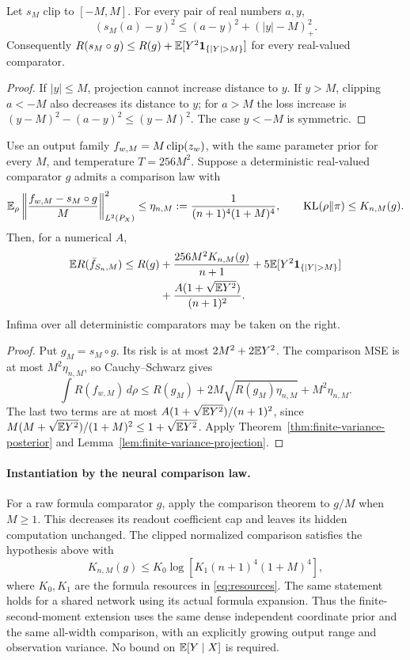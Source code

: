 \begin{lemma}
\label{lem:finite-variance-projection}
Let $s_M$ clip to $[-M,M]$. For every pair of real numbers $a,y$,
\begin{equation}
 (s_M(a)-y)^2\le(a-y)^2+(|y|-M)_+^2.
 \label{eq:pointwise-projection-transfer}
\end{equation}
Consequently $R(s_M\circ g)\le R(g)+
\E[Y^2\mathbf1_{\{|Y|>M\}}]$ for every real-valued comparator.
\end{lemma}
\begin{proof}
If $|y|\le M$, projection cannot increase distance to $y$.
If $y>M$, clipping $a<-M$ also decreases its distance to $y$;
for $a>M$ the loss increase is
$(y-M)^2-(a-y)^2\le(y-M)^2$.
The case $y<-M$ is symmetric.
\end{proof}

\begin{corollary}
\label{cor:finite-variance-comparator}
Use an output family $f_{w,M}=M\operatorname{clip}(z_w)$, with the same parameter
prior for every $M$, and temperature $T=256M^2$.
Suppose a deterministic real-valued comparator $g$ admits a
comparison law with
\[
 \mathbb E_\rho\left\|\frac{f_{w,M}-s_M\circ g}{M}\right\|_{L^2(P_X)}^2
 \le\eta_{n,M}:=\frac1{(n+1)^4(1+M)^4},
 \qquad \operatorname{KL}(\rho\|\pi)\le K_{n,M}(g).
\]
Then, for a numerical $A$,
\begin{align}
 \E R(\bar f_{S_n,M})\le R(g)
 &+\frac{256M^2 K_{n,M}(g)}{n+1}
 +5\E[Y^2\mathbf1_{\{|Y|>M\}}]\notag\\
 &+\frac{A(1+\sqrt{\E Y^2})}{(n+1)^2}.
 \label{eq:finite-variance-real-oracle}
\end{align}
Infima over all deterministic comparators may be taken on the right.
\end{corollary}
\begin{proof}
Put $g_M=s_M\circ g$. Its risk is at most
$2M^2+2\mathbb E Y^2$. The comparison MSE is at most $M^2\eta_{n,M}$,
so Cauchy--Schwarz gives
\[
 \int R(f_{w,M})\,d\rho
 \le R(g_M)+2M\sqrt{R(g_M)\eta_{n,M}}+M^2\eta_{n,M}.
\]
The last two terms are at most
$A(1+\sqrt{\mathbb E Y^2})/(n+1)^2$, since
$M(M+\sqrt{\mathbb E Y^2})/(1+M)^2\le1+\sqrt{\mathbb E Y^2}$.
Apply Theorem~\ref{thm:finite-variance-posterior} and
Lemma~\ref{lem:finite-variance-projection}.
\end{proof}

\paragraph{Instantiation by the neural comparison law.}
For a raw formula comparator $g$, apply the comparison theorem to
$g/M$ when $M\ge1$. This decreases its readout coefficient cap and
leaves its hidden computation unchanged. The clipped normalized
comparison satisfies the hypothesis above with
\[
 K_{n,M}(g)\le
 K_0\log\!\left[K_1(n+1)^4(1+M)^4\right],
\]
where $K_0,K_1$ are the formula resources in
\eqref{eq:resources}. The same statement holds for a shared network
using its actual formula expansion. Thus the finite-second-moment
extension uses the same dense independent coordinate prior and the
same all-width comparison, with an explicitly growing output range
and observation variance. No bound on $\mathbb E[Y\mid X]$ is required.

